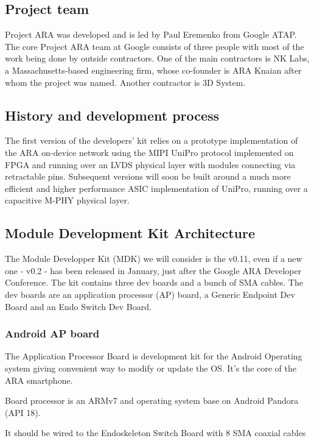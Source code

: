 \subsection{Project team}

Project ARA was developed and is led by Paul Eremenko from Google ATAP. The core Project ARA team at Google consists of three people with most of the work being done by outside contractors. One of the main contractors is NK Labs, a Massachusetts-based engineering firm, whose co-founder is ARA Knaian after whom the project was named. Another contractor is 3D System.

\subsection{History and development process}

The first version of the developers' kit relies on a prototype implementation of the ARA on-device network using the MIPI UniPro protocol implemented on FPGA and running over an LVDS physical layer with modules connecting via retractable pins. Subsequent versions will soon be built around a much more efficient and higher performance ASIC implementation of UniPro, running over a capacitive M-PHY physical layer.
         
\subsection{Module Development Kit Architecture}

The Module Developper Kit (MDK) we will consider is the v0.11, even if a new one - v0.2 - has been released in January, just after the Google ARA Developer Conference.
The kit contains three dev boards and a bunch of SMA cables. The dev boards are an application processor (AP) board, a Generic Endpoint Dev Board and an Endo Switch Dev Board.

\subsubsection{Android AP board}

The Application Processor Board is development kit for the Android Operating system giving convenient way to modify or update the OS. It's the core of the ARA smartphone.

Board processor is an ARMv7 and operating system base on Android Pandora (API 18).

It should be wired to the Endoskeleton Switch Board with 8 SMA coaxial cables


